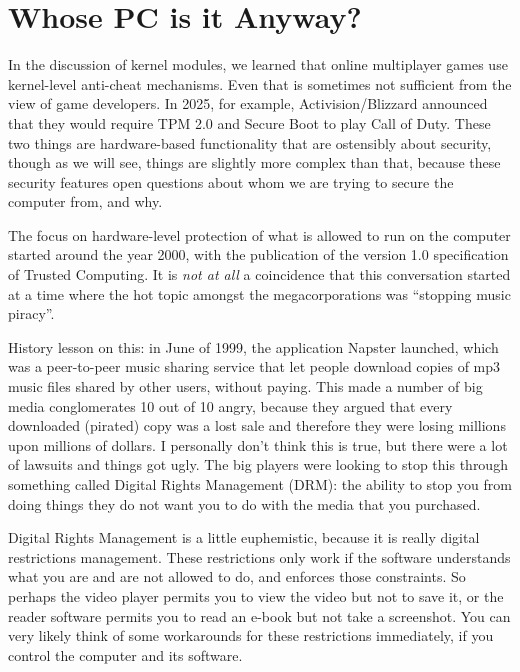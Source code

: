 




\section*{Whose PC is it Anyway?}
In the discussion of kernel modules, we learned that online multiplayer games use kernel-level anti-cheat mechanisms. Even that is sometimes not sufficient from the view of game developers. In 2025, for example, Activision/Blizzard announced that they would require TPM 2.0 and Secure Boot to play Call of Duty. These two things are hardware-based functionality that are ostensibly about security, though as we will see, things are slightly more complex than that, because these security features open questions about whom we are trying to secure the computer from, and why.


The focus on hardware-level protection of what is allowed to run on the computer started around the year 2000, with the publication of the version 1.0 specification of Trusted Computing. It is \textit{not at all} a coincidence that this conversation started at a time where the hot topic amongst the megacorporations was ``stopping music piracy''.

History lesson on this: in June of 1999, the application Napster launched, which was a peer-to-peer music sharing service that let people download copies of mp3 music files shared by other users, without paying. This made a number of big media conglomerates 10 out of 10 angry, because they argued that every downloaded (pirated) copy was a lost sale and therefore they were losing millions upon millions of dollars. I personally don't think this is true, but there were a lot of lawsuits and things got ugly. The big players were looking to stop this through something called Digital Rights Management (DRM): the ability to stop you from doing things they do not want you to do with the media that you purchased. 

Digital Rights Management is a little euphemistic, because it is really digital restrictions management. These restrictions only work if the software understands what you are and are not allowed to do, and enforces those constraints. So perhaps the video player permits you to view the video but not to save it, or the reader software permits you to read an e-book but not take a screenshot. You can very likely think of some workarounds for these restrictions immediately, if you control the computer and its software.

